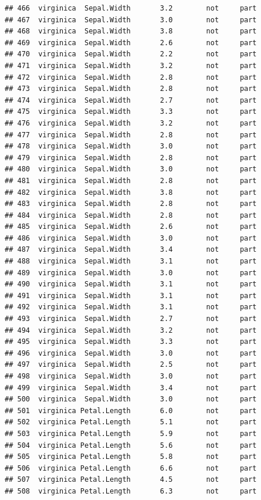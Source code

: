 \documentclass[krantz2]{krantz}\usepackage{knitr}%
\begin{document}
\begin{knitrout}
\begin{kframe}
\begin{verbatim}
## 466  virginica  Sepal.Width       3.2        not     part
## 467  virginica  Sepal.Width       3.0        not     part
## 468  virginica  Sepal.Width       3.8        not     part
## 469  virginica  Sepal.Width       2.6        not     part
## 470  virginica  Sepal.Width       2.2        not     part
## 471  virginica  Sepal.Width       3.2        not     part
## 472  virginica  Sepal.Width       2.8        not     part
## 473  virginica  Sepal.Width       2.8        not     part
## 474  virginica  Sepal.Width       2.7        not     part
## 475  virginica  Sepal.Width       3.3        not     part
## 476  virginica  Sepal.Width       3.2        not     part
## 477  virginica  Sepal.Width       2.8        not     part
## 478  virginica  Sepal.Width       3.0        not     part
## 479  virginica  Sepal.Width       2.8        not     part
## 480  virginica  Sepal.Width       3.0        not     part
## 481  virginica  Sepal.Width       2.8        not     part
## 482  virginica  Sepal.Width       3.8        not     part
## 483  virginica  Sepal.Width       2.8        not     part
## 484  virginica  Sepal.Width       2.8        not     part
## 485  virginica  Sepal.Width       2.6        not     part
## 486  virginica  Sepal.Width       3.0        not     part
## 487  virginica  Sepal.Width       3.4        not     part
## 488  virginica  Sepal.Width       3.1        not     part
## 489  virginica  Sepal.Width       3.0        not     part
## 490  virginica  Sepal.Width       3.1        not     part
## 491  virginica  Sepal.Width       3.1        not     part
## 492  virginica  Sepal.Width       3.1        not     part
## 493  virginica  Sepal.Width       2.7        not     part
## 494  virginica  Sepal.Width       3.2        not     part
## 495  virginica  Sepal.Width       3.3        not     part
## 496  virginica  Sepal.Width       3.0        not     part
## 497  virginica  Sepal.Width       2.5        not     part
## 498  virginica  Sepal.Width       3.0        not     part
## 499  virginica  Sepal.Width       3.4        not     part
## 500  virginica  Sepal.Width       3.0        not     part
## 501  virginica Petal.Length       6.0        not     part
## 502  virginica Petal.Length       5.1        not     part
## 503  virginica Petal.Length       5.9        not     part
## 504  virginica Petal.Length       5.6        not     part
## 505  virginica Petal.Length       5.8        not     part
## 506  virginica Petal.Length       6.6        not     part
## 507  virginica Petal.Length       4.5        not     part
## 508  virginica Petal.Length       6.3        not     part

\end{verbatim}
\end{kframe}
\end{knitrout}
\end{document}
